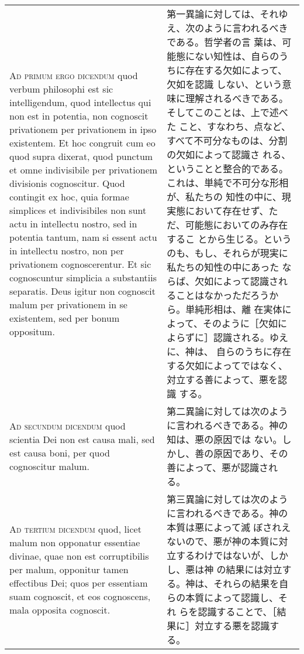 \documentclass[10pt]{jsarticle} %
\begin{document}
\begin{longtable}{p{21em}p{21em}}
\\


{\scshape Ad primum ergo dicendum} quod verbum philosophi est sic
intelligendum, quod intellectus qui non est in potentia, non cognoscit
privationem per privationem in ipso existentem. Et hoc congruit cum eo
quod supra dixerat, quod punctum et omne indivisibile per privationem
divisionis cognoscitur. Quod contingit ex hoc, quia formae simplices
et indivisibiles non sunt actu in intellectu nostro, sed in potentia
tantum, nam si essent actu in intellectu nostro, non per privationem
cognoscerentur. Et sic cognoscuntur simplicia a substantiis
separatis. Deus igitur non cognoscit malum per privationem in se
existentem, sed per bonum oppositum.

&

第一異論に対しては、それゆえ、次のように言われるべきである。哲学者の言
葉は、可能態にない知性は、自らのうちに存在する欠如によって、欠如を認識
しない、という意味に理解されるべきである。そしてこのことは、上で述べた
こと、すなわち、点など、すべて不可分なものは、分割の欠如によって認識さ
れる、ということと整合的である。これは、単純で不可分な形相が、私たちの
知性の中に、現実態において存在せず、ただ、可能態においてのみ存在するこ
とから生じる。というのも、もし、それらが現実に私たちの知性の中にあった
ならば、欠如によって認識されることはなかっただろうから。単純形相は、離
在実体によって、そのように［欠如によらずに］認識される。ゆえに、神は、
自らのうちに存在する欠如によってではなく、対立する善によって、悪を認識
する。

\\


{\scshape Ad secundum dicendum} quod scientia Dei non est causa mali,
sed est causa boni, per quod cognoscitur malum.

&

第二異論に対しては次のように言われるべきである。神の知は、悪の原因では
ない。しかし、善の原因であり、その善によって、悪が認識される。

\\


{\scshape Ad tertium dicendum} quod, licet malum non opponatur
essentiae divinae, quae non est corruptibilis per malum, opponitur
tamen effectibus Dei; quos per essentiam suam cognoscit, et eos
cognoscens, mala opposita cognoscit.

&

第三異論に対しては次のように言われるべきである。神の本質は悪によって滅
ぼされえないので、悪が神の本質に対立するわけではないが、しかし、悪は神
の結果には対立する。神は、それらの結果を自らの本質によって認識し、それ
らを認識することで、［結果に］対立する悪を認識する。


\end{longtable}
\end{document}
